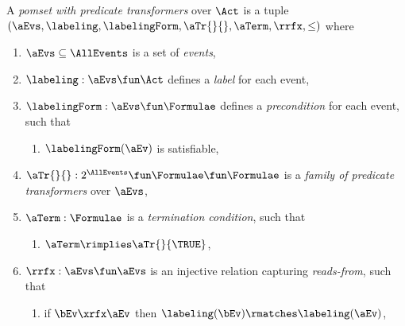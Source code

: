 \begin{definition}
  \label{def:pomset}
  A \emph{pomset with predicate transformers} over $\Act$
  is a tuple $(\aEvs, \labeling, \labelingForm, \aTr{}{}, \aTerm, {\rrfx}, {\le})$ where
  \begin{enumerate}[,label=(\textsc{m}\arabic*),ref=\textsc{m}\arabic*]
  \item \label{pom-E} 
    $\aEvs\subseteq\AllEvents$ is a set of \emph{events},
  \item \label{pom-lambda} 
    $\labeling: \aEvs \fun \Act$ defines a \emph{label} for each event,
  \item \label{pom-kappa} 
    $\labelingForm:\aEvs\fun\Formulae$ defines a \emph{precondition} for each event, such that
    \begin{enumerate}
    \item \label{pom-kappa-sat}
      $\labelingForm(\aEv)$ is satisfiable,
    \end{enumerate}
  \item \label{pom-tau} 
    $\aTr{}{}:2^{\AllEvents}\fun\Formulae \fun\Formulae$ is a \emph{family of predicate transformers} over $\aEvs$, 
  \item \label{pom-term} 
    $\aTerm:\Formulae$ is a \emph{termination condition}, such that 
    \begin{enumerate}
    \item \label{pom-term-tau}
      $\aTerm\rimplies\aTr{}{\TRUE}$,
    \end{enumerate}
  \item \label{pom-rf} 
    ${\rrfx} : \aEvs\fun\aEvs$ is an injective relation capturing
    \emph{reads-from}, such that 
    \begin{enumerate}
    \item \label{pom-rf-match}
      if $\bEv\xrfx\aEv$ then $\labeling(\bEv) \rmatches \labeling(\aEv)$,

\end{enumerate}
\end{enumerate}
\end{definition}
